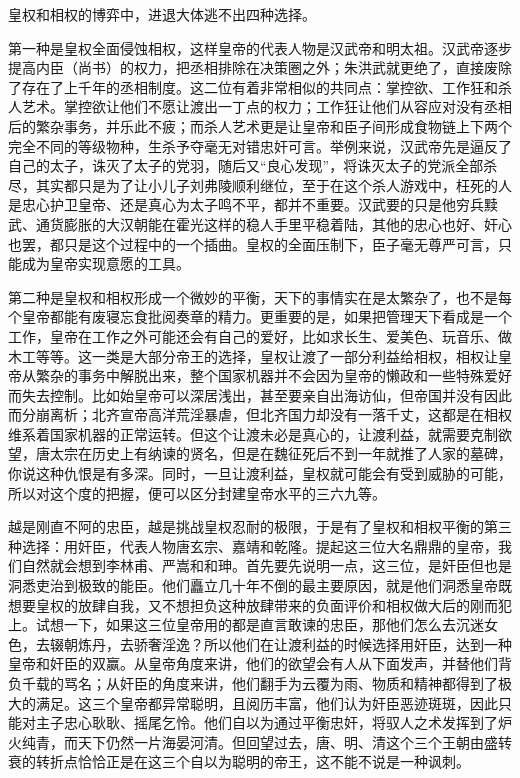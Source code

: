 \documentclass[]{book}
\begin{document}
皇权和相权的博弈中，进退大体逃不出四种选择。

第一种是皇权全面侵蚀相权，这样皇帝的代表人物是汉武帝和明太祖。汉武帝逐步提高内臣（尚书）的权力，把丞相排除在决策圈之外；朱洪武就更绝了，直接废除了存在了上千年的丞相制度。这二位有着非常相似的共同点：掌控欲、工作狂和杀人艺术。掌控欲让他们不愿让渡出一丁点的权力；工作狂让他们从容应对没有丞相后的繁杂事务，并乐此不疲；而杀人艺术更是让皇帝和臣子间形成食物链上下两个完全不同的等级物种，生杀予夺毫无对错忠奸可言。举例来说，汉武帝先是逼反了自己的太子，诛灭了太子的党羽，随后又``良心发现''，将诛灭太子的党派全部杀尽，其实都只是为了让小儿子刘弗陵顺利继位，至于在这个杀人游戏中，枉死的人是忠心护卫皇帝、还是真心为太子鸣不平，都并不重要。汉武要的只是他穷兵黩武、通货膨胀的大汉朝能在霍光这样的稳人手里平稳着陆，其他的忠心也好、奸心也罢，都只是这个过程中的一个插曲。皇权的全面压制下，臣子毫无尊严可言，只能成为皇帝实现意愿的工具。

第二种是皇权和相权形成一个微妙的平衡，天下的事情实在是太繁杂了，也不是每个皇帝都能有废寝忘食批阅奏章的精力。更重要的是，如果把管理天下看成是一个工作，皇帝在工作之外可能还会有自己的爱好，比如求长生、爱美色、玩音乐、做木工等等。这一类是大部分帝王的选择，皇权让渡了一部分利益给相权，相权让皇帝从繁杂的事务中解脱出来，整个国家机器并不会因为皇帝的懒政和一些特殊爱好而失去控制。比如始皇帝可以深居浅出，甚至要亲自出海访仙，但帝国并没有因此而分崩离析；北齐宣帝高洋荒淫暴虐，但北齐国力却没有一落千丈，这都是在相权维系着国家机器的正常运转。但这个让渡未必是真心的，让渡利益，就需要克制欲望，唐太宗在历史上有纳谏的贤名，但是在魏征死后不到一年就推了人家的墓碑，你说这种仇恨是有多深。同时，一旦让渡利益，皇权就可能会有受到威胁的可能，所以对这个度的把握，便可以区分封建皇帝水平的三六九等。

越是刚直不阿的忠臣，越是挑战皇权忍耐的极限，于是有了皇权和相权平衡的第三种选择：用奸臣，代表人物唐玄宗、嘉靖和乾隆。提起这三位大名鼎鼎的皇帝，我们自然就会想到李林甫、严嵩和和珅。首先要先说明一点，这三位，是奸臣但也是洞悉吏治到极致的能臣。他们矗立几十年不倒的最主要原因，就是他们洞悉皇帝既想要皇权的放肆自我，又不想担负这种放肆带来的负面评价和相权做大后的刚而犯上。试想一下，如果这三位皇帝用的都是直言敢谏的忠臣，那他们怎么去沉迷女色，去辍朝炼丹，去骄奢淫逸？所以他们在让渡利益的时候选择用奸臣，达到一种皇帝和奸臣的双赢。从皇帝角度来讲，他们的欲望会有人从下面发声，并替他们背负千载的骂名；从奸臣的角度来讲，他们翻手为云覆为雨、物质和精神都得到了极大的满足。这三个皇帝都异常聪明，且阅历丰富，他们认为奸臣恶迹斑斑，因此只能对主子忠心耿耿、摇尾乞怜。他们自以为通过平衡忠奸，将驭人之术发挥到了炉火纯青，而天下仍然一片海晏河清。但回望过去，唐、明、清这个三个王朝由盛转衰的转折点恰恰正是在这三个自以为聪明的帝王，这不能不说是一种讽刺。
\end{document}
